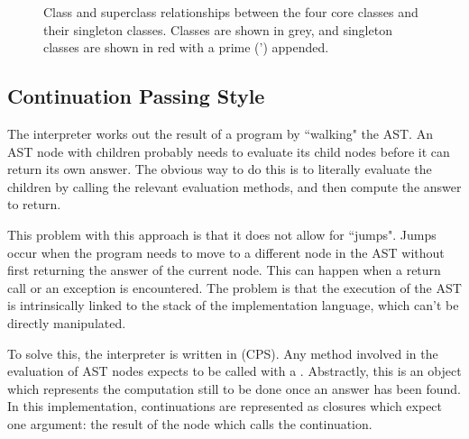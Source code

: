 \begin{figure}
\begin{center}
\caption{Class and superclass relationships between the four core classes and their singleton classes. Classes are shown in grey, and singleton classes are shown in red with a prime (') appended.}
\label{fig:core_relationships}
\end{center}
\end{figure}

\subsection{Continuation Passing Style}

The interpreter works out the result of a program by ``walking" the AST. An AST node with children probably needs to evaluate its child nodes before it can return its own answer. The obvious way to do this is to literally evaluate the children by calling the relevant evaluation methods, and then compute the answer to return.

This problem with this approach is that it does not allow for ``jumps". Jumps occur when the program needs to move to a different node in the AST without first returning the answer of the current node. This can happen when a return call or an exception is encountered. The problem is that the execution of the AST is intrinsically linked to the stack of the implementation language, which can't be directly manipulated.

To solve this, the interpreter is written in  (CPS). Any method involved in the evaluation of AST nodes expects to be called with a . Abstractly, this is an object which represents the computation still to be done once an answer has been found. In this implementation, continuations are represented as closures which expect one argument: the result of the node which calls the continuation.

